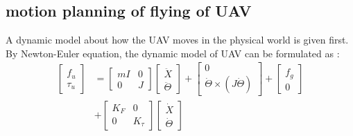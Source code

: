 \documentclass{ieeeaccess}
\begin{document}
\subsection{motion planning of flying of UAV}
A dynamic model about how the UAV moves in the physical world is given first. By Newton-Euler equation, the dynamic model of UAV can be formulated as \cite{sabatino2015quadrotor}:
\begin{equation} \label{eq:uav} 
    \begin{split}
        \begin{bmatrix}
            f_u \\ \tau_u
        \end{bmatrix}&=\begin{bmatrix}
            mI & 0 \\ 0 & J
        \end{bmatrix}\begin{bmatrix}
            \ddot{X} \\ \ddot{\Theta}
        \end{bmatrix}+\begin{bmatrix}
            0 \\ \dot{\Theta}\times(J\dot{\Theta})
        \end{bmatrix}+\begin{bmatrix}
            f_g \\ 0
        \end{bmatrix}
        \\
        &+\begin{bmatrix}
            K_F & 0 \\
            0 & K_\tau
        \end{bmatrix}\begin{bmatrix}
            \dot{X} \\ \dot{\Theta}
        \end{bmatrix}
    \end{split}
\end{equation}
\end{document}
